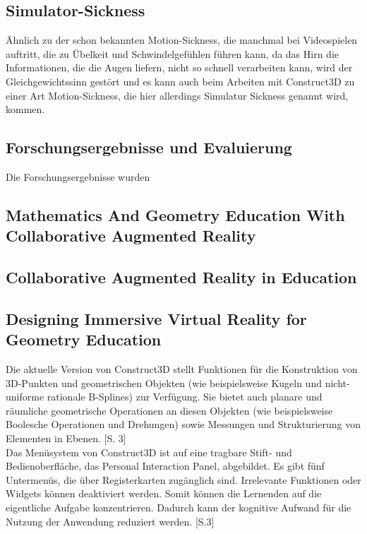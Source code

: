 \documentclass[deutsch]{llncs}
\begin{document}
\subsection{Simulator-Sickness}
\label{subsec:}
Ähnlich zu der schon bekannten Motion-Sickness, die manchmal bei Videospielen auftritt, die zu Übelkeit und Schwindelgefühlen führen kann, da das Hirn die Informationen, die die Augen liefern, nicht so schnell verarbeiten kann, wird der Gleichgewichtssinn gestört und es kann auch beim Arbeiten mit Construct3D zu einer Art Motion-Sickness, die hier allerdings
Simulatur Sickness genannt wird, kommen.

\subsection{Forschungsergebnisse und Evaluierung}
\label{subsec:}
Die Forschungsergebnisse wurden 

\subsection{Mathematics And Geometry Education With Collaborative Augmented Reality}

\subsection{Collaborative Augmented Reality in Education}

\subsection{Designing Immersive Virtual Reality for Geometry Education}
\label{subsec:}
Die aktuelle Version von Construct3D stellt Funktionen für die Konstruktion von 3D-Punkten und geometrischen Objekten (wie beispielsweise Kugeln und
 nicht-uniforme rationale B-Splines) zur Verfügung. Sie bietet auch planare und räumliche geometrische Operationen an diesen Objekten
 (wie beispielsweise Boolesche Operationen und Drehungen) sowie Messungen und Strukturierung von Elementen in Ebenen. [S. 3]\\
Das Menüsystem von Construct3D ist auf eine tragbare Stift- und Bedienoberfläche, das Personal Interaction Panel, abgebildet. Es gibt fünf 
Untermenüs, die über Registerkarten zugänglich sind. Irrelevante Funktionen oder Widgets können deaktiviert werden. Somit können die 
Lernenden auf die eigentliche Aufgabe konzentrieren. Dadurch kann der kognitive Aufwand für die Nutzung der Anwendung reduziert werden. [S.3]\\
\end{document}
